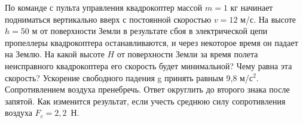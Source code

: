 
По команде с пульта управления квадрокоптер массой $m = 1$ кг начинает подниматься вертикально вверх с постоянной 
скоростью $v=12$ м/с. На высоте $h=50$ м от поверхности Земли в результате сбоя в электрической цепи пропеллеры 
квадрокоптера останавливаются, и через некоторое время он падает на Землю. На какой высоте $H$ от поверхности 
Земли за время полета неисправного квадрокоптера его скорость  будет минимальной? Чему равна эта скорость?  
Ускорение свободного падения g принять равным 9,8 м/с$^2$. Сопротивлением воздуха пренебречь. Ответ округлить 
до второго знака после запятой. Как изменится результат, если учесть среднюю силу сопротивления воздуха $F_c = 2,2$~Н.